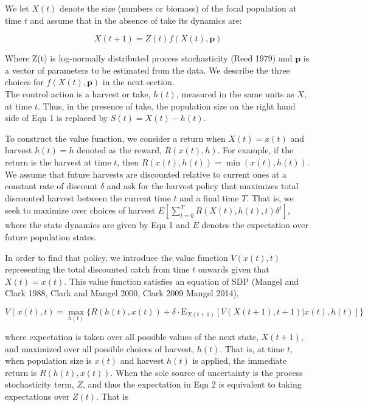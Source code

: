 \documentclass[author-year, 12pt,review]{components/elsarticle} %
\begin{document}
We let $X(t)$ denote the size (numbers or biomass) of the focal
population at time $t$ and assume that in the absence of take its
dynamics are:

\begin{equation}
X(t+1) = Z(t) f(X(t), \mathbf{p}) \label{eq1} 
\end{equation}

Where Z(t) is log-normally distributed process stochasticity (Reed 1979)
and $\mathbf{p}$ is a vector of parameters to be estimated from the
data. We describe the three choices for $f(X(t),\mathbf{p})$ in the next
section.\\The control action is a harvest or take, $h(t)$, measured in
the same units as $X$, at time $t$. Thus, in the presence of take, the
population size on the right hand side of Eqn 1 is replaced by
$S(t) = X(t) - h(t)$.

To construct the value function, we consider a return when $X(t) = x(t)$
and harvest $h(t) = h$ denoted as the reward, $R(x(t), h)$. For example,
if the return is the harvest at time $t$, then
$R(x(t), h(t)) = \min(x(t), h(t))$. We assume that future harvests are
discounted relative to current ones at a constant rate of discount
$\delta$ and ask for the harvest policy that maximizes total discounted
harvest between the current time $t$ and a final time $T$. That is, we
seek to maximize over choices of harvest
$E [ \sum_{t = 0}^{T}  R(X(t), h(t), t) \delta^t]$, where the state
dynamics are given by Eqn 1 and $E$ denotes the expectation over future
population states.

In order to find that policy, we introduce the value function
$V(x(t), t)$ representing the total discounted catch from time $t$
onwards given that $X(t) = x(t)$. This value function satisfies an
equation of SDP (Mangel and Clark 1988, Clark and Mangel 2000, Clark
2009 Mangel 2014),

\begin{equation}
V(x(t), t) = \max_{h(t)} \lbrace R(h(t), x(t)) + \delta \cdot \mathbf{\mathrm{E}}_{X(t+1)} \left[ V(X(t+1), t+1) | x(t), h(t) \right] \rbrace
\end{equation}

where expectation is taken over all possible values of the next state,
$X(t+1)$, and maximized over all possible choices of harvest, $h(t)$.
That is, at time $t$, when population size is $x(t)$ and harvest $h(t)$
is applied, the immediate return is $R(h(t), x(t))$. When the sole
source of uncertainty is the process stochasticity term, $Z$, and thus
the expectation in Eqn 2 is equivalent to taking expectations over
$Z(t)$. That is
\end{document}
